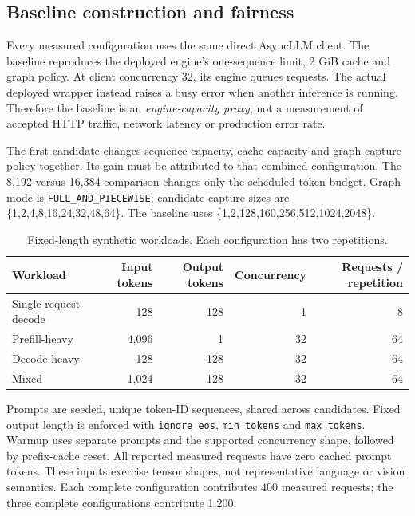 \documentclass[10pt,a4paper]{article}
\newcommand{\code}[1]{\texttt{\small #1}}
\begin{document}
\subsection{Baseline construction and fairness}
Every measured configuration uses the same direct AsyncLLM client. The baseline
reproduces the deployed engine's one-sequence limit, 2 GiB cache and graph policy.
At client concurrency 32, its engine queues requests. The actual deployed wrapper
instead raises a busy error when another inference is running. Therefore the
baseline is an \emph{engine-capacity proxy}, not a measurement of accepted HTTP
traffic, network latency or production error rate.

The first candidate changes sequence capacity, cache capacity and graph capture
policy together. Its gain must be attributed to that combined configuration.
The 8,192-versus-16,384 comparison changes only the scheduled-token budget.
Graph mode is \code{FULL\_AND\_PIECEWISE}; candidate capture sizes are
\{1,2,4,8,16,24,32,48,64\}. The baseline uses
\{1,2,128,160,256,512,1024,2048\}.

\begin{table}[h]
\centering\small
\caption{Fixed-length synthetic workloads. Each configuration has two repetitions.}
\begin{tabular}{@{}lrrrr@{}}
\toprule
Workload & Input tokens & Output tokens & Concurrency & Requests / repetition \\
\midrule
Single-request decode & 128 & 128 & 1 & 8 \\
Prefill-heavy & 4,096 & 1 & 32 & 64 \\
Decode-heavy & 128 & 128 & 32 & 64 \\
Mixed & 1,024 & 128 & 32 & 64 \\
\bottomrule
\end{tabular}
\end{table}

Prompts are seeded, unique token-ID sequences, shared across candidates.
Fixed output length is enforced with \code{ignore\_eos}, \code{min\_tokens} and
\code{max\_tokens}. Warmup uses separate prompts and the supported concurrency
shape, followed by prefix-cache reset. All reported measured requests have zero
cached prompt tokens. These inputs exercise tensor shapes, not representative
language or vision semantics. Each complete configuration contributes 400 measured
requests; the three complete configurations contribute 1,200.
\end{document}

